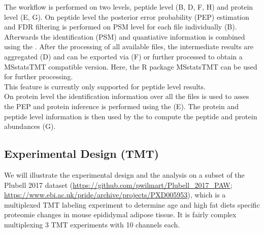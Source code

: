 The workflow is performed on two levels, peptide level (B, D, F, H) and protein level (E, G). On peptide level the posterior error probability (PEP) estimation and FDR filtering is performed on PSM level for each file individually (B). Afterwards the identification (PSM) and quantiative information is combined using the . After the processing of all available files, the intermediate results are aggregated (D) and can be exported via  (F) or further processed to obtain a MSstatsTMT
compatible version. Here, the R package MSstatsTMT can be used for further processing. \\

This feature is currently only supported for peptide level results. \\

On protein level the identification information over all the files is used to asses the PEP and protein inference is performed using the  (E). The protein and peptide level information is then used by the to compute the peptide and protein abundances (G).  

\subsection{Experimental Design (TMT)}
We will illustrate the experimental design and the analysis on a subset of the Plubell 2017 dataset (\url{https://github.com/pwilmart/Plubell_2017_PAW; https://www.ebi.ac.uk/pride/archive/projects/PXD005953}), which is a multiplexed TMT labeling experiment to determine age and high fat diets specific proteomie changes in mouse epididymal adipose tissue. It is fairly complex multiplexing 3 TMT experiments with 10 channels each. 











